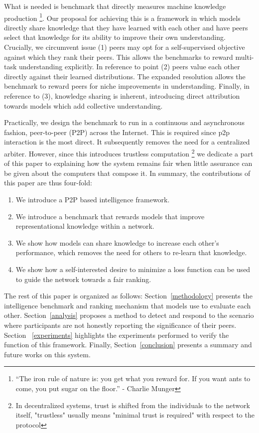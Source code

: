\documentclass{article}
\begin{document}
What is needed is benchmark that directly measures machine knowledge production \footnote{“The iron rule of nature is: you get what you reward for. If you want ants to come, you put sugar on the floor.” - Charlie Munger}. Our proposal for achieving this is a framework in which models directly share knowledge that they have learned with each other and have peers select that knowledge for its ability to improve their own understanding. Crucially, we circumvent issue (1) peers may opt for a self-supervised objective against which they rank their peers. This allows the benchmarks to reward multi-task understanding explicitly. In reference to point (2) peers value each other directly against their learned distributions. The expanded resolution allows the benchmark to reward peers for niche improvements in understanding. Finally, in reference to (3), knowledge sharing is inherent, introducing direct attribution towards models which add collective understanding. 

Practically, we design the benchmark to run in a continuous and asynchronous fashion, peer-to-peer (P2P) across the Internet. This is required since p2p interaction is the most direct. It subsequently removes the need for a centralized arbiter. However,  since this introduces trustless computation \footnote{ In decentralized systems, trust is shifted from the individuals to the network itself, "trustless" usually means "minimal trust is required" with respect to the protocol} we dedicate a part of this paper to explaining how the system remains fair when little assurance can be given about the computers that compose it. In summary, the contributions of this paper are thus four-fold:
\begin{enumerate}
	\item We introduce a P2P based intelligence framework.
	\item We introduce a benchmark that rewards models that improve representational knowledge within a network.
	\item We show how models can share knowledge to increase each other's performance, which removes the need for others to re-learn that knowledge. 
	\item We show how a self-interested desire to minimize a loss function can be used to guide the network towards a fair ranking.
\end{enumerate}

The rest of this paper is organized as follows: Section~\ref{methodology} presents the intelligence benchmark and ranking mechanism that models use to evaluate each other. Section~\ref{analysis} proposes a method to detect and respond to the scenario where participants are not honestly reporting the significance of their peers. Section ~\ref{experiments} highlights the experiments performed to verify the function of this framework. Finally, Section~\ref{conclusion} presents a summary and future works on this system.
\end{document}
